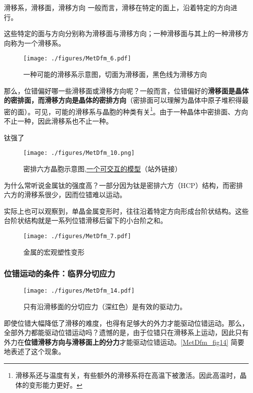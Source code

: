 \begin{theorem}{滑移系，滑移面，滑移方向}
一般而言，滑移在特定的面上，沿着特定的方向进行。

这些特定的面与方向分别称为滑移面与滑移方向；一种滑移面与其上的一种滑移方向称为一个滑移系。

\end{theorem}
\begin{figure}[ht]
\centering
\texttt{[image: ./figures/MetDfm\_6.pdf]}
\caption{一种可能的滑移系示意图，切面为滑移面，黑色线为滑移方向} \label{MetDfm_fig6}
\end{figure}

那么，位错偏好哪一些滑移面或滑移方向呢？一般而言，位错偏好的\textbf{滑移面是晶体的密排面，而滑移方向是晶体的密排方向}（密排面可以理解为晶体中原子堆积得最密的面）。可见，可能的滑移系与晶胞的种类有关\footnote{滑移系还与温度有关，有些额外的滑移系将在高温下被激活。因此高温时，晶体的变形能力更好。}。由于一种晶体中密排面、方向不止一种，因此滑移系也不止一种。

\begin{example}{钛强了}
\begin{figure}[ht]
\centering
\texttt{[image: ./figures/MetDfm\_10.png]}
\caption{密排六方晶胞示意图,\href{https://www.geogebra.org/m/xrzejabt}{一个可交互的模型}（站外链接）} \label{MetDfm_fig10}
\end{figure}
为什么常听说金属钛的强度高？一部分因为钛是密排六方（HCP）结构，而密排六方的滑移系很少，因而位错难以运动。
\end{example}

实际上也可以观察到，单晶金属变形时，往往沿着特定方向形成台阶状结构。这些台阶状结构就是一系列位错滑移后留下的小台阶之和。
\begin{figure}[ht]
\centering
\texttt{[image: ./figures/MetDfm\_7.pdf]}
\caption{金属的宏观塑性变形} \label{MetDfm_fig7}
\end{figure}

\subsubsection{位错运动的条件：临界分切应力}

\begin{figure}[ht]
\centering
\texttt{[image: ./figures/MetDfm\_14.pdf]}
\caption{只有沿滑移面的分切应力（深红色）是有效的驱动力。} \label{MetDfm_fig14}
\end{figure}
即使位错大幅降低了滑移的难度，也得有足够大的外力才能驱动位错运动。那么，全部外力都能驱动位错运动吗？遗憾的是，由于位错只在滑移系上运动，因此只有外力在\textbf{位错滑移方向与滑移面上的分力}才能驱动位错运动。\autoref{MetDfm_fig14} 简要地表述了这个现象。


